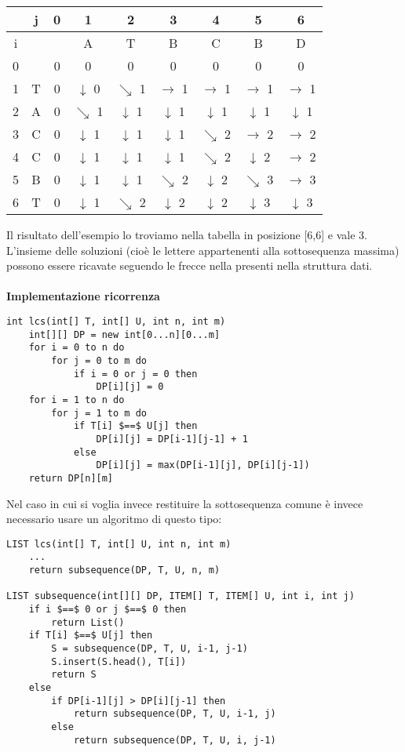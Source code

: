 \documentclass[../cheatSheetAlgoritmi.tex]{subfiles}
\begin{document}
\begin{center}
	\renewcommand{\arraystretch}{1.2}
	\begin{tabular}{ |c|c|c|c|c|c|c|c|c| } 
		\hline
			&j &0 &1 &2 &3 &4 &5 &6\\
		\hline
			i & & &A &T &B &C &B &D\\
		\hline
			0 & &0 &0 &0 &0 &0 &0 &0\\
		\hline
			1 &T &0 & $\downarrow$ 0 & $\searrow$ 1 & $\rightarrow$ 1 & $\rightarrow$ 1 & $\rightarrow$ 1 & $\rightarrow$ 1\\
		\hline
			2 &A &0 & $\searrow$ 1 & $\downarrow$ 1 & $\downarrow$ 1 & $\downarrow$ 1 & $\downarrow$ 1 & $\downarrow$ 1\\
		\hline
			3 &C &0 & $\downarrow$ 1 & $\downarrow$ 1 & $\downarrow$ 1 & $\searrow$ 2 & $\rightarrow$ 2 & $\rightarrow$ 2\\
		\hline
			4 &C &0 & $\downarrow$ 1 & $\downarrow$ 1 & $\downarrow$ 1 & $\searrow$ 2 & $\downarrow$ 2 & $\rightarrow$ 2\\
		\hline
			5 &B &0 & $\downarrow$ 1 & $\downarrow$ 1 & $\searrow$ 2 & $\downarrow$ 2 & $\searrow$ 3 & $\rightarrow$ 3\\
		\hline
			6 &T &0 & $\downarrow$ 1 & $\searrow$ 2 & $\downarrow$ 2 & $\downarrow$ 2 & $\downarrow$ 3 & $\downarrow$ 3\\
			\hline
	\end{tabular}
\end{center}
Il risultato dell'esempio lo troviamo nella tabella in posizione [6,6] e vale 3. L'insieme delle soluzioni (cioè le lettere appartenenti alla sottosequenza massima) possono essere ricavate seguendo le frecce nella presenti nella struttura dati.\\\\
\textbf{Implementazione ricorrenza}
\begin{lstlisting}[caption= Lunghezza LCS]
int lcs(int[] T, int[] U, int n, int m)
	int[][] DP = new int[0...n][0...m]
	for i = 0 to n do
		for j = 0 to m do
			if i = 0 or j = 0 then
				DP[i][j] = 0
	for i = 1 to n do
		for j = 1 to m do
			if T[i] $==$ U[j] then
				DP[i][j] = DP[i-1][j-1] + 1
			else
				DP[i][j] = max(DP[i-1][j], DP[i][j-1])
	return DP[n][m]
\end{lstlisting}
\newpage
\begin{flushleft}
Nel caso in cui si voglia invece restituire la sottosequenza comune è invece necessario usare un algoritmo di questo tipo:
\end{flushleft}
\begin{lstlisting}[caption=Ricostruire LCS]
LIST lcs(int[] T, int[] U, int n, int m)
	...
	return subsequence(DP, T, U, n, m)
	
LIST subsequence(int[][] DP, ITEM[] T, ITEM[] U, int i, int j)
	if i $==$ 0 or j $==$ 0 then
		return List()
	if T[i] $==$ U[j] then
		S = subsequence(DP, T, U, i-1, j-1)
		S.insert(S.head(), T[i])
		return S
	else
		if DP[i-1][j] > DP[i][j-1] then
			return subsequence(DP, T, U, i-1, j)
		else
			return subsequence(DP, T, U, i, j-1)
\end{lstlisting}
\end{document}
